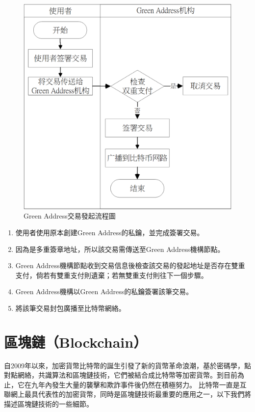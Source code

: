 		 	\begin{figure}[htbp]
				\centering
				\includegraphics[width = .7\textwidth]{gatx.png}
				\caption{Green Address交易發起流程圖}\label{gatx}
			\end{figure}

			\begin{enumerate}
				\item 使用者使用原本創建Green Address的私鑰，並完成簽署交易。
				\item 因為是多重簽章地址，所以該交易需傳送至Green Address機構節點。
				\item Green Address機構節點收到交易信息後檢查該交易的發起地址是否存在雙重支付，倘若有雙重支付則遺棄；若無雙重支付則往下一個步驟。
				\item Green Address機構以Green Address的私鑰簽署該筆交易。
				\item 將該筆交易封包廣播至比特幣網絡。
			\end{enumerate}

	\section{區塊鏈（Blockchain）}
	自2009年以來，加密貨幣比特幣的誕生引發了新的貨幣革命浪潮，基於密碼學，點對點網絡，共識算法和區塊鏈技術，它們被結合成比特幣等加密貨幣。到目前為止，它在九年內發生大量的襲擊和欺詐事件後仍然在積極努力。 比特幣一直是互聯網上最具代表性的加密貨幣，同時是區塊鏈技術最重要的應用之一，以下我們將描述區塊鏈技術的一些細節。

